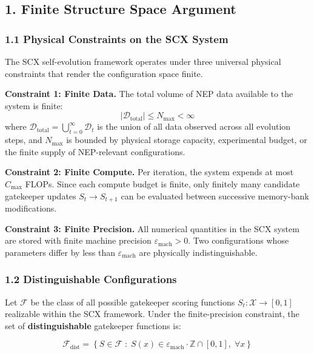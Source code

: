\documentclass[
  12pt,
]{article}
\begin{document}
\subsection{1. Finite Structure Space
Argument}\label{finite-structure-space-argument}

\subsubsection{1.1 Physical Constraints on the SCX
System}\label{physical-constraints-on-the-scx-system}

The SCX self-evolution framework operates under three universal physical
constraints that render the configuration space finite.

\textbf{Constraint 1: Finite Data.} The total volume of NEP data
available to the system is finite:
\[|\mathcal{D}_{\text{total}}| \leq N_{\text{max}} < \infty\] where
\(\mathcal{D}_{\text{total}} = \bigcup_{t=0}^{\infty} \mathcal{D}_t\) is
the union of all data observed across all evolution steps, and
\(N_{\text{max}}\) is bounded by physical storage capacity, experimental
budget, or the finite supply of NEP-relevant configurations.

\textbf{Constraint 2: Finite Compute.} Per iteration, the system expends
at most \(C_{\text{max}}\) FLOPs. Since each compute budget is finite,
only finitely many candidate gatekeeper updates \(S_t \to S_{t+1}\) can
be evaluated between successive memory-bank modifications.

\textbf{Constraint 3: Finite Precision.} All numerical quantities in the
SCX system are stored with finite machine precision
\(\varepsilon_{\text{mach}} > 0\). Two configurations whose parameters
differ by less than \(\varepsilon_{\text{mach}}\) are physically
indistinguishable.

\subsubsection{1.2 Distinguishable
Configurations}\label{distinguishable-configurations}

Let \(\mathcal{F}\) be the class of all possible gatekeeper scoring
functions \(S_t: \mathcal{X} \to [0,1]\) realizable within the SCX
framework. Under the finite-precision constraint, the set of
\textbf{distinguishable} gatekeeper functions is:

\[\mathcal{F}_{\text{dist}} = \left\{ S \in \mathcal{F} \;:\; S(x) \in \varepsilon_{\text{mach}} \cdot \mathbb{Z} \cap [0,1],\; \forall x \right\}\]
\end{document}
